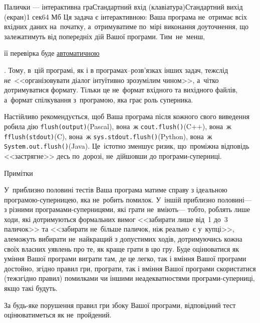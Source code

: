 \begin{problem}{Палички --- інтерактивна гра}{Стандартний вхід (клавіатура)}{Стандартний вихід (екран)}{1 сек}{64 Мб}
Ця задача є інтерактивною: 
Ваша програма не~отримає всіх вхідних даних на~початку,
а~отримуватиме по~мірі виконання доуточнення, 
що залежатимуть від попередніх дій Вашої програми. 
Тим~не~менш, \begin{slshape}її перевірка буде
\underline{автоматичною}\end{slshape}. 
Тому, в~цій програмі, як і в програмах--роз\-в'\-яз\-ках інших задач, 
теж\nolinebreak[3] слід 
\emph{не}~<<організовувати діалог інтуїтивно зрозумілим чином>>,
а~чітко дотримуватися формату. Тільки це не~формат вхідного та вихідного файлів,
а~формат спілкування з~програмою, яка грає роль суперника.

Настійливо рекомендується, щоб Ваша програма після кожного свого виведення 
робила дію \verb"flush(output)"\nolinebreak[2] (Pascal), 
вона~ж \verb"cout.flush()"\nolinebreak[2] (C++), 
вона~ж \verb"fflush(stdout)"\nolinebreak[2] (C), 
вона~ж \verb"sys.stdout.flush()"\nolinebreak[2] (Python),
вона~ж \verb"System.out.flush()"\nolinebreak[2] (Java).
Це~істотно зменшує ризик, 
що~проміжна відповідь <<застрягне>> десь по~дорозі, 
не~дійшовши до програми-суперниці.


\Example

\noindent\begin{exampleSimpleThree}{5em}{5em}{10cm}{Примітки}
%
\end{exampleSimpleThree}


\Scoring

У~приблизно половині тестів Ваша програма матиме справу з ідеальною програмою-су\-пер\-ни\-цею, яка не~робить помилок.
У~іншій приблизно половині\nolinebreak[3] --- з різними програмами-су\-пер\-ни\-ця\-ми, які грати не~вміють\nolinebreak[3] --- тобто, роблять лише ходи, які дотримуються формальних вимог <<забирати лише від~1 до~3 паличок>> та <<забирати не~більше паличок, ніж реально~є у~купці>>, 
але\nolinebreak[2] можуть вибирати не~найкращий з допустимих ходів, дотримуючись кожна своїх власних уявлень про те, як краще грати в цю гру.
Буде оцінюватися 
як уміння Вашої програми виграти там, де це легко,
так і вміння Вашої програми достойно, згідно правил гри, програти, 
так і вміння Вашої програми скористатися (теж\nolinebreak[2] згідно правил) помилками чи іншими неадекватностями програми-суперниці, якщо такі будуть.

За будь-яке порушення правил гри з\nolinebreak[3] боку Вашої програми, відповідний тест оцінюватиметься як не~пройдений.

\end{problem}